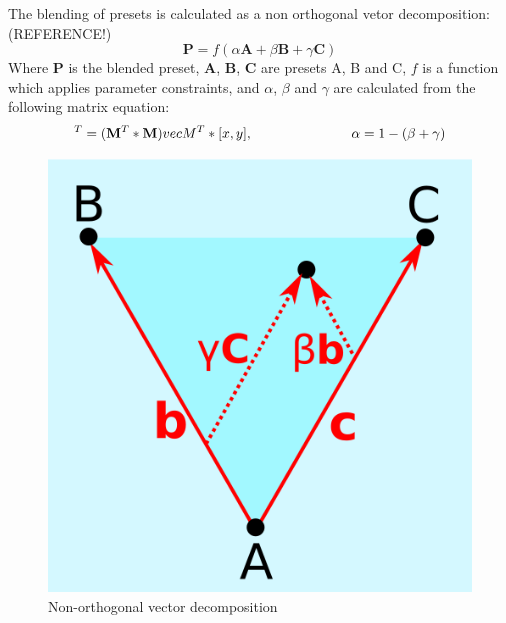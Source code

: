 \documentclass[11pt, oneside]{report}   	%
\renewcommand{\vec}[1]{\mathbf{#1}}
\begin{document}
The blending of presets is calculated as a non orthogonal vetor decomposition: (REFERENCE!)
\begin{equation}
	\vec{P} = f(\alpha\vec{A} + \beta\vec{B} + \gamma\vec{C})
	\label{eq:PresetMix}
\end{equation}
Where $\vec{P}$ is the blended preset, $\vec{A}$, $\vec{B}$, $\vec{C}$ are presets A, B and C, $f$ is a function which applies parameter constraints, and $\alpha$, $\beta$ and $\gamma$ are calculated from the following matrix equation:
\begin{equation}
[\beta,  \gamma]^T = (\vec{M}^T*\vec{M})\\vec{M}^T*[x, y], 
	\hspace{1in} \alpha = 1 - (\beta + \gamma)
\end{equation}
\begin{figure}
	\vspace{-30pt}
	\includegraphics[width = \textwidth/3]{BlendVectors.png}
	\caption{Non-orthogonal vector decomposition}
	\label{fig:BlendingVectors}

\end{figure}
\end{document}
